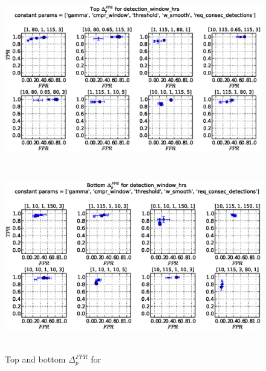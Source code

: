 \begin{figure}[!h]
\begin{center}
\includegraphics[height=3in]{../fig/final/top_fpr/detection_window_hrs}
\includegraphics[height=3in]{../fig/final/bottom_fpr/detection_window_hrs}
\end{center}
\caption{\label{fig:delta_top_bottom5f} Top and bottom $\Delta_p^{FPR}$ for }
\end{figure}

